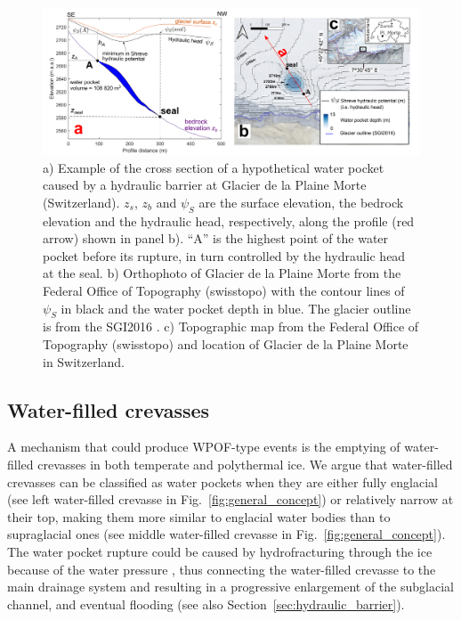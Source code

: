 \begin{figure}
    \centering
    \includegraphics[width=1\linewidth]{chapters/chapter_WPOFs/PlaineMorte_WP_fig.png}
    \caption{a) Example of the cross section of a hypothetical water pocket caused by a hydraulic barrier at Glacier de la Plaine Morte (Switzerland). $z_s$, $z_b$ and $\psi_S$ are the surface elevation, the bedrock elevation and the hydraulic head, respectively, along the profile (red arrow) shown in panel b). ``A'' is the highest point of the water pocket before its rupture, in turn controlled by the hydraulic head at the seal. b) Orthophoto of Glacier de la Plaine Morte from the Federal Office of Topography (swisstopo) with the contour lines of $\psi_S$ in black and the water pocket depth in blue. The glacier outline is from the SGI2016 \citep{Linsbauer&al2021}. c) Topographic map from the Federal Office of Topography (swisstopo) and location of Glacier de la Plaine Morte in Switzerland.}
    \label{fig:plainemorteWP}
\end{figure}


\subsection{ Water-filled crevasses}

A mechanism that could produce WPOF-type events is the emptying of water-filled crevasses in both temperate and polythermal ice. We argue that water-filled crevasses can be classified as water pockets when they are either fully englacial (see left water-filled crevasse in Fig.~\ref{fig:general_concept}) or relatively narrow at their top, making them more similar to englacial water bodies than to supraglacial ones (see middle water-filled crevasse in Fig.~\ref{fig:general_concept}). The water pocket rupture could be caused by hydrofracturing through the ice because of the water pressure \citep[e.g.][]{Benn&al2009,Scambos&al2009}, thus connecting the water-filled crevasse to the main drainage system and resulting in a progressive enlargement of the subglacial channel, and eventual flooding (see also Section~\ref{sec:hydraulic_barrier}). 

